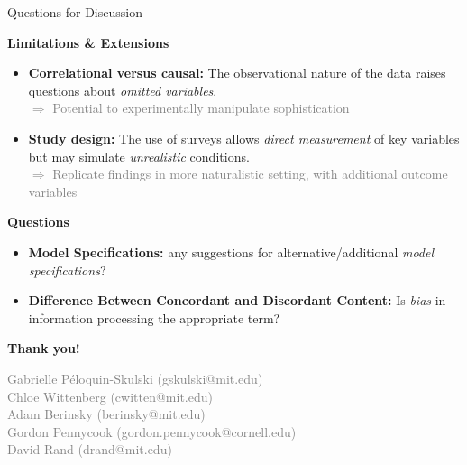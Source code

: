 \documentclass[10pt,table]{beamer}
\begin{document}
\begin{frame}[t,fragile, label = discussion]{Questions for Discussion}


\setlength{\leftmargini}{15pt}
\setlength{\rightmargini}{20pt}
\vspace{0.5em} 
\small

\textbf{Limitations \& Extensions} \vspace{0.25em}
\begin{itemize}
    \item \alert{\textbf{Correlational versus causal: }} The observational nature of the data raises questions about \textit{omitted variables}. \pause \vspace{0.15em} \\ \textcolor{gray}{\footnotesize $\Rightarrow$ Potential to experimentally manipulate sophistication} \medskip \vspace{0.25em}  \pause
    \item \alert{\textbf{Study design: }} The use of surveys allows \textit{direct measurement} of key variables but may simulate \textit{unrealistic} conditions. \pause \vspace{0.15em} \\ \textcolor{gray}{\footnotesize $\Rightarrow$ Replicate findings in more naturalistic setting, with additional outcome variables} 
\end{itemize} \medskip

\textbf{Questions} \vspace{0.25em}
\begin{itemize}
    \item \alert{\textbf{Model Specifications: }} any suggestions for alternative/additional \textit{model specifications}?  \pause 
    \medskip \vspace{0.25em}  \pause
    \item \alert{\textbf{Difference Between Concordant and Discordant Content: }} Is \textit{bias} in information processing the appropriate term? 
\end{itemize}


\end{frame}


\begin{frame}[plain]{}  
\begin{center}
    \huge{\textbf{Thank you!}} \bigskip

 \small{\textcolor{gray}{Gabrielle Péloquin-Skulski (gskulski@mit.edu) \\
 Chloe Wittenberg (cwitten@mit.edu) \\
 Adam Berinsky (berinsky@mit.edu) \\
 Gordon Pennycook (gordon.pennycook@cornell.edu) \\
 David Rand (drand@mit.edu)}}
\end{center}
\end{frame}
\end{document}
